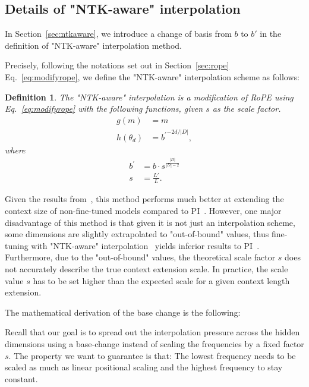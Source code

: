 \documentclass{article} %
\newtheorem{definition}{Definition}
\begin{document}
\subsection{Details of "NTK-aware" interpolation}\label{appendix:ntkaware}

In Section~\ref{sec:ntkaware}, we introduce a change of basis from $b$ to $b'$ in the definition of "NTK-aware" interpolation method. 

Precisely, following the notations set out in Section~\ref{sec:rope} Eq.~\ref{eq:modifyrope}, we define the "NTK-aware" interpolation scheme as follows:

\begin{definition}
The "NTK-aware" interpolation is a modification of RoPE using Eq.~\ref{eq:modifyrope} with the following functions, given $s$ as the scale factor.
\begin{align}
g(m) &= m\\
h(\theta_d) &= {b^\prime}^{-2d/|D|},
\end{align}
where
\begin{align}
    {b^\prime} &= b \cdot s^\frac{|D|}{|D|-2}\\
    {s} &= \frac{L'}{L}.
\end{align}
\end{definition}

Given the results from~\citep{blocntkaware}, this method performs much better at extending the context size of non-fine-tuned models compared to PI~\citep{chen2023extending}. However, one major disadvantage of this method is that given it is not just an interpolation scheme, some dimensions are slightly extrapolated to "out-of-bound" values, thus fine-tuning with "NTK-aware" interpolation~\citep{blocntkaware} yields inferior results to PI~\citep{chen2023extending}. Furthermore, due to the "out-of-bound" values, the theoretical scale factor $s$ does not accurately describe the true context extension scale. In practice, the scale value $s$ has to be set higher than the expected scale for a given context length extension.

The mathematical derivation of the base change is the following:

Recall that our goal is to spread out the interpolation pressure across the hidden dimensions using a base-change instead of scaling the frequencies by a fixed factor $s$. The property we want to guarantee is that: The lowest frequency needs to be scaled as much as linear positional scaling and the highest frequency to stay constant. 
\end{document}
